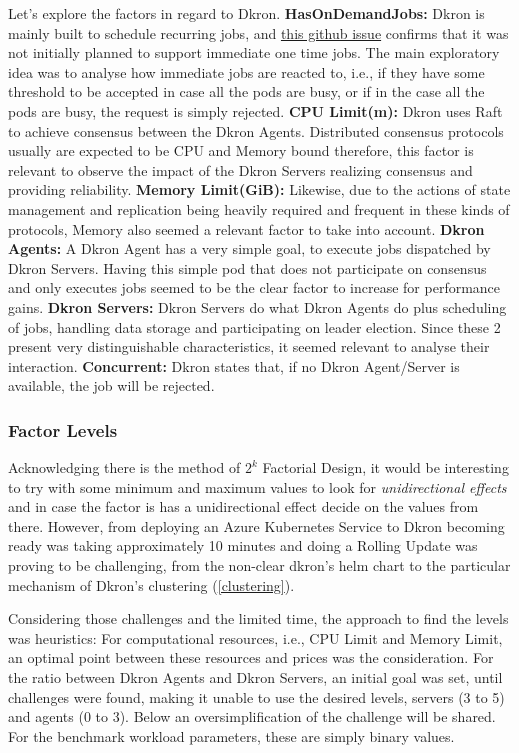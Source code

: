 \documentclass[runningheads]{llncs}
\begin{document}
Let's explore the factors in regard to Dkron.
\textbf{HasOnDemandJobs:} Dkron is mainly built to schedule recurring jobs,
and \href{https://github.com/distribworks/dkron/issues/578}{this github issue} confirms that it was not initially planned
to support immediate one time jobs. The main exploratory idea was to analyse how immediate jobs are reacted to,
i.e., if they have some threshold to be accepted in case all the pods are busy, or if in the case
all the pods are busy, the request is simply rejected.
\textbf{CPU Limit(m):} Dkron uses Raft to achieve consensus between the Dkron Agents.
Distributed consensus protocols usually are expected to be CPU and Memory bound therefore,
this factor is relevant to observe the impact of the Dkron Servers realizing consensus and
providing reliability.
\textbf{Memory Limit(GiB):} Likewise, due to the actions of state management and replication
being heavily required and frequent in these kinds of protocols, Memory also seemed a relevant
factor to take into account.
\textbf{Dkron Agents:} A Dkron Agent has a very simple goal, to execute jobs dispatched by
Dkron Servers. Having this simple pod that does not participate on consensus and only executes jobs
seemed to be the clear factor to increase for performance gains.
\textbf{Dkron Servers:} Dkron Servers do what Dkron Agents do plus scheduling of jobs,
handling data storage and participating on leader election. Since these 2 present very
distinguishable characteristics, it seemed relevant to analyse their interaction.
\textbf{Concurrent:} Dkron states that, if no Dkron Agent/Server is available, the job will be rejected.


\subsubsection{Factor Levels}
Acknowledging there is the method of $2^k$ Factorial Design, it would be interesting to
try with some minimum and maximum values to look for \textit{unidirectional effects} and
in case the factor is has a unidirectional effect decide on the values from there. However,
from deploying an Azure Kubernetes Service to Dkron becoming ready was taking approximately
10 minutes and doing a Rolling Update was proving to be challenging, from the non-clear dkron's
helm chart to the particular mechanism of Dkron's clustering (\ref{clustering}).

Considering those challenges and the limited time, the approach to find the levels was heuristics:
For computational resources, i.e., CPU Limit and Memory Limit, an optimal point between
    these resources and prices was the consideration.
For the ratio between Dkron Agents and Dkron Servers, an initial goal was set, until
    challenges were found, making it unable to use the desired levels, servers (3 to 5) and agents (0 to 3).
    Below an oversimplification of the challenge will be shared.
For the benchmark workload parameters, these are simply binary values.
\end{document}
